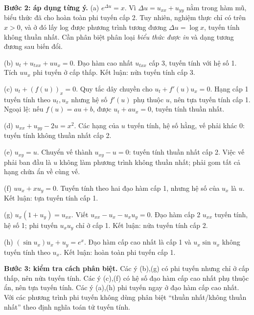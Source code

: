 \documentclass[10pt,a4paper]{article}
\begin{document}
\textbf{Bước 2: áp dụng từng ý.}
(a) $e^{\Delta u}=x$. Vì $\Delta u=u_{xx}+u_{yy}$ nằm trong hàm mũ, biểu thức đã cho hoàn toàn phi tuyến cấp 2. Tuy nhiên, nghiệm thực chỉ có trên $x>0$, và ở đó lấy log được phương trình tương đương $\Delta u=\log x$, tuyến tính không thuần nhất. Cần phân biệt phân loại \emph{biểu thức được in} và dạng tương đương sau biến đổi.

(b) $u_t+u_{txx}+uu_x=0$. Đạo hàm cao nhất $u_{txx}$ cấp 3, tuyến tính với hệ số 1. Tích $uu_x$ phi tuyến ở cấp thấp. Kết luận: nửa tuyến tính cấp 3.

(c) $u_t+(f(u))_x=0$. Quy tắc dây chuyền cho $u_t+f'(u)u_x=0$. Hạng cấp 1 tuyến tính theo $u_t,u_x$ nhưng hệ số $f'(u)$ phụ thuộc $u$, nên tựa tuyến tính cấp 1. Ngoại lệ: nếu $f(u)=au+b$, được $u_t+au_x=0$, tuyến tính thuần nhất.

(d) $u_{xx}+u_{yy}-2u=x^2$. Các hạng của $u$ tuyến tính, hệ số hằng, vế phải khác 0: tuyến tính không thuần nhất cấp 2.

(e) $u_{xy}=u$. Chuyển vế thành $u_{xy}-u=0$: tuyến tính thuần nhất cấp 2. Việc vế phải ban đầu là $u$ không làm phương trình không thuần nhất; phải gom tất cả hạng chứa ẩn về cùng vế.

(f) $uu_x+xu_y=0$. Tuyến tính theo hai đạo hàm cấp 1, nhưng hệ số của $u_x$ là $u$. Kết luận: tựa tuyến tính cấp 1.

(g) $u_x(1+u_y)=u_{xx}$. Viết $u_{xx}-u_x-u_xu_y=0$. Đạo hàm cấp 2 $u_{xx}$ tuyến tính, hệ số 1; phi tuyến $u_xu_y$ chỉ ở cấp 1. Kết luận: nửa tuyến tính cấp 2.

(h) $(\sin u_x)u_x+u_y=e^x$. Đạo hàm cấp cao nhất là cấp 1 và $u_x\sin u_x$ không tuyến tính theo $u_x$. Kết luận: hoàn toàn phi tuyến cấp 1.

\textbf{Bước 3: kiểm tra cách phân biệt.} Các ý (b),(g) có phi tuyến nhưng chỉ ở cấp thấp, nên nửa tuyến tính. Các ý (c),(f) có hệ số đạo hàm cấp cao nhất phụ thuộc ẩn, nên tựa tuyến tính. Các ý (a),(h) phi tuyến ngay ở đạo hàm cấp cao nhất. Với các phương trình phi tuyến không dùng phân biệt ``thuần nhất/không thuần nhất'' theo định nghĩa toán tử tuyến tính.
\end{document}
